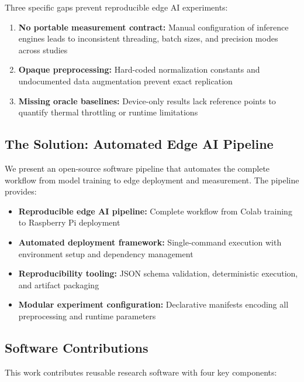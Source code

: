 \documentclass[review]{elsarticle}
\begin{document}
Three specific gaps prevent reproducible edge AI experiments:

\begin{enumerate}
\item \textbf{No portable measurement contract:} Manual configuration of inference engines leads to inconsistent threading, batch sizes, and precision modes across studies
\item \textbf{Opaque preprocessing:} Hard-coded normalization constants and undocumented data augmentation prevent exact replication
\item \textbf{Missing oracle baselines:} Device-only results lack reference points to quantify thermal throttling or runtime limitations
\end{enumerate}

\subsection{The Solution: Automated Edge AI Pipeline}

We present an open-source software pipeline that automates the complete workflow from model training to edge deployment and measurement. The pipeline provides:

\begin{itemize}
\item \textbf{Reproducible edge AI pipeline:} Complete workflow from Colab training to Raspberry Pi deployment
\item \textbf{Automated deployment framework:} Single-command execution with environment setup and dependency management
\item \textbf{Reproducibility tooling:} JSON schema validation, deterministic execution, and artifact packaging
\item \textbf{Modular experiment configuration:} Declarative manifests encoding all preprocessing and runtime parameters
\end{itemize}

\subsection{Software Contributions}

This work contributes reusable research software with four key components:
\end{document}
